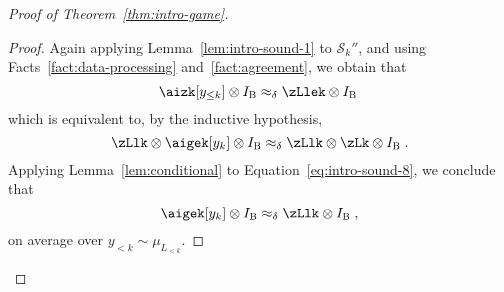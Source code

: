 \documentclass[11pt]{article}
\theoremstyle{definition}
\newcommand{\Id}{\ensuremath{I}}
\newcommand{\ib}{\Id_\bob}
\newcommand{\strategy}{\mathscr{S}}
\newcommand{\labelstyle}[1]{\ensuremath{\textsc{#1}}\xspace}
\newcommand{\bob}{\labelstyle{B}}
\begin{document}
\begin{proof}[Proof of Theorem~\ref{thm:intro-game}]
\begin{proof}
    Again applying Lemma~\ref{lem:intro-sound-1} to $\strategy_k''$, and using
    Facts~\ref{fact:data-processing} and~\ref{fact:agreement}, we obtain that
    \begin{equation*}
      \aizk[y_{\le k}] \otimes \ib \approx_\delta \zLlek \otimes \ib\;
    \end{equation*}
    which is equivalent to, by the inductive hypothesis,
    \begin{equation}\label{eq:intro-sound-8}
      \zLlk \otimes \aigek[y_k] \otimes \ib \approx_\delta \zLlk \otimes \zLk
      \otimes \ib\;.
    \end{equation}
    Applying Lemma~\ref{lem:conditional} to Equation~\eqref{eq:intro-sound-8},
    we conclude that
    \begin{equation}\label{eq:consistency-equation}
      \aigek[y_k] \otimes \ib \approx_\delta
      \zLlk \otimes \ib\;,
    \end{equation}
    on average over $y_{<k} \sim \mu_{L_{<k}}$.
  

\end{proof}
\end{proof}
\end{document}
